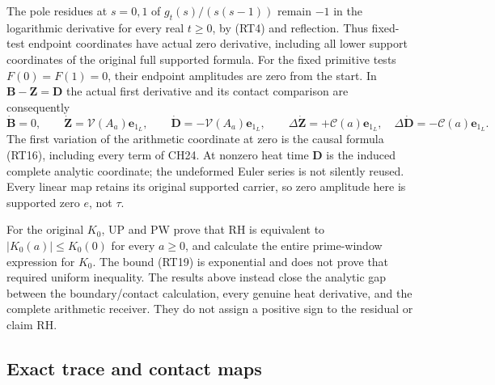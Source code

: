 \documentclass[
  10pt,
  a4paper,
]{article}
\begin{document}
The pole residues at \(s=0,1\) of \(g_t(s)/(s(s-1))\) remain \(-1\) in
the logarithmic derivative for every real \(t\ge0\), by (RT4) and
reflection. Thus fixed-test endpoint coordinates have actual zero
derivative, including all lower support coordinates of the original full
supported formula. For the fixed primitive tests \(F(0)=F(1)=0\), their
endpoint amplitudes are zero from the start. In
\(\boldsymbol B-\boldsymbol Z=\boldsymbol D\) the actual first
derivative and its contact comparison are consequently \[
\dot{\boldsymbol B}=0,\qquad
\dot{\boldsymbol Z}=\mathcal V(A_a)\mathbf e_{1_L},\qquad
\dot{\boldsymbol D}=-\mathcal V(A_a)\mathbf e_{1_L},\qquad
\Delta\dot{\boldsymbol Z}=+\mathcal C(a)\mathbf e_{1_L},\quad
\Delta\dot{\boldsymbol D}=-\mathcal C(a)\mathbf e_{1_L}.
\tag{RT30}
\] The first variation of the arithmetic coordinate at zero is the
causal formula (RT16), including every term of CH24. At nonzero heat
time \(\boldsymbol D\) is the induced complete analytic coordinate; the
undeformed Euler series is not silently reused. Every linear map retains
its original supported carrier, so zero amplitude here is supported zero
\(e\), not \(\tau\).

For the original \(K_0\), UP and PW prove that RH is equivalent to
\(|K_0(a)|\le K_0(0)\) for every \(a\ge0\), and calculate the entire
prime-window expression for \(K_0\). The bound (RT19) is exponential and
does not prove that required uniform inequality. The results above
instead close the analytic gap between the boundary/contact calculation,
every genuine heat derivative, and the complete arithmetic receiver.
They do not assign a positive sign to the residual or claim RH.

\subsection{Exact trace and contact
maps}\label{exact-trace-and-contact-maps}
\end{document}
